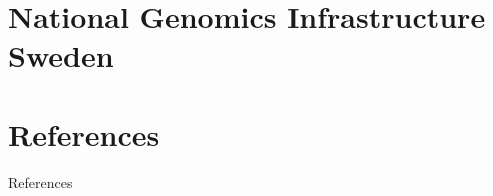 \documentclass[10pt]{beamer}
\begin{document}

\section{National Genomics Infrastructure Sweden}


\section{References}
\begin{frame}[allowframebreaks]{References}
\begingroup
\renewcommand*{\bibfont}{\footnotesize} 
\printbibliography[heading=none]
\endgroup
\end{frame}
\end{document}
